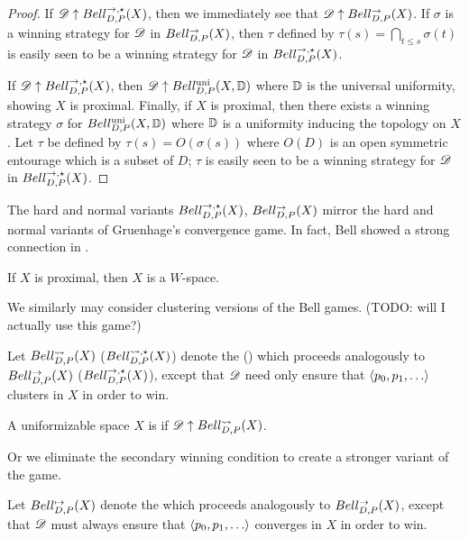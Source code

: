 \begin{proof}
  If $\mathscr{D}\uparrow Bell_{D,P}^{\to,\star}(X)$, then we immediately see that
  $\mathscr{D}\uparrow Bell_{D,P}^{\to}(X)$. If $\sigma$ is a winning strategy for $\mathscr{D}$
  in $Bell_{D,P}^{\to}(X)$, then $\tau$ defined by
  $\tau(s)=\bigcap_{t\leq s}\sigma(t)$ is easily seen to be a winning strategy
  for $\mathscr{D}$ in $Bell_{D,P}^{\to,\star}(X)$.

  If $\mathscr{D}\uparrow Bell_{D,P}^{\to,\star}(X)$, then $\mathscr{D}\uparrow Bell_{D,P}^{\textrm{uni}}(X,\mathbb{D})$
  where $\mathbb{D}$ is the universal uniformity, showing $X$ is proximal.
  Finally, if $X$ is proximal, then there exists a winning strategy $\sigma$
  for $Bell_{D,P}^{\textrm{uni}}(X,\mathbb{D})$ where $\mathbb{D}$ is a uniformity inducing the
  topology on $X$. Let $\tau$ be defined by $\tau(s)=O(\sigma(s))$ where
  $O(D)$ is an open symmetric entourage which is a subset of $D$; $\tau$
  is easily seen to be a winning strategy for $\mathscr{D}$ in $Bell_{D,P}^{\to,\star}(X)$.
\end{proof}

The hard and normal variants $Bell_{D,P}^{\to,\star}(X)$, $Bell_{D,P}^{\to}(X)$ mirror the
hard and normal variants of Gruenhage's convergence game. In fact, Bell
showed a strong connection in \cite{MR3239205}.

\begin{thm}
  If $X$ is proximal, then $X$ is a $W$-space.
\end{thm}

We similarly may consider clustering versions of the Bell games.
(TODO: will I actually use this game?)

\begin{defn}
  Let $Bell_{D,P}^{\leadsto}(X)$ ($Bell_{D,P}^{\leadsto,\star}(X)$) denote the
   () which
  proceeds analogously to $Bell_{D,P}^{\to}(X)$ ($Bell_{D,P}^{\to,\star}(X)$), except
  that $\mathscr{D}$ need only ensure that $\<p_0,p_1,\dots\>$ clusters
  in $X$ in order to win.
\end{defn}

\begin{defn}
  A uniformizable space $X$ is  if
  $\mathscr{D} \uparrow Bell_{D,P}^{\leadsto}(X)$.
\end{defn}

Or we eliminate the secondary winning condition to create a stronger
variant of the game.

\begin{defn}
  Let $Bell_{D,P}^{\mapsto}(X)$ denote the
   which
  proceeds analogously to $Bell_{D,P}^{\to}(X)$, except
  that $\mathscr{D}$ must always ensure that $\<p_0,p_1,\dots\>$ converges
  in $X$ in order to win.
\end{defn}

